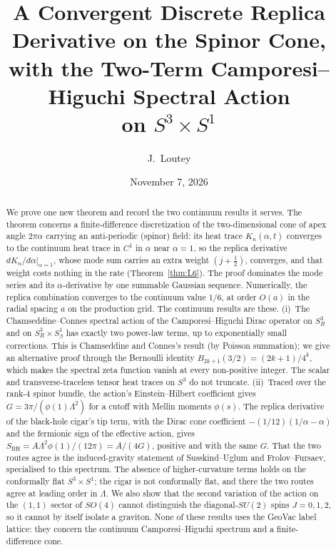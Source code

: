 \documentclass[11pt,a4paper]{article}
\title{A Convergent Discrete Replica Derivative on the Spinor Cone, \\
       with the Two-Term Camporesi--Higuchi Spectral Action \\
       on $S^3 \times S^1$}
\author{J.~Loutey}
\date{November 7, 2026}
\theoremstyle{plain}
\theoremstyle{definition}
\newcommand{\sthree}{S^{3}}
\newcommand{\BH}{\mathrm{BH}}
\renewcommand{\_}{\textunderscore\allowbreak}
\begin{document}
\maketitle

\begin{abstract}
We prove one new theorem and record the two continuum results it serves.
The theorem concerns a finite-difference discretization of the
two-dimensional cone of apex angle $2\pi\alpha$ carrying an
anti-periodic (spinor) field: its heat trace $K_n(\alpha, t)$ converges
to the continuum heat trace in $C^1$ in $\alpha$ near $\alpha = 1$, so the
replica derivative $dK_n/d\alpha|_{\alpha=1}$, whose mode sum carries an
extra weight $(j+\tfrac12)$, converges, and that weight costs nothing in
the rate (Theorem~\ref{thm:L6}). The proof dominates the mode series and
its $\alpha$-derivative by one summable Gaussian sequence. Numerically, the
replica combination converges to the continuum value $1/6$, at order
$O(a)$ in the radial spacing $a$ on the production grid. The continuum
results are these. (i)~The Chamseddine--Connes spectral action of the
Camporesi--Higuchi Dirac operator on $\sthree_R$ and on
$\sthree_R \times S^1_\beta$ has exactly two power-law terms, up to
exponentially small corrections. This is Chamseddine and Connes's result
(by Poisson summation); we give an alternative proof through the
Bernoulli identity $B_{2k+1}(3/2) = (2k{+}1)/4^k$, which makes the
spectral zeta function vanish at every non-positive integer. The scalar
and transverse-traceless tensor heat traces on $\sthree$ do not
truncate. (ii)~Traced over the rank-4 spinor bundle, the action's
Einstein--Hilbert coefficient gives $G = 3\pi/(\phi(1)\Lambda^2)$ for a
cutoff with Mellin moments $\phi(s)$. The replica derivative of the
black-hole cigar's tip term, with the Dirac cone coefficient
$-(1/12)(1/\alpha - \alpha)$ and the fermionic sign of the effective
action, gives $S_{\BH} = A\Lambda^2\phi(1)/(12\pi) = A/(4G)$, positive and
with the same $G$. That the two routes agree is the induced-gravity
statement of Susskind--Uglum and Frolov--Fursaev, specialised to this
spectrum. The absence of higher-curvature terms holds on the conformally
flat $\sthree \times S^1$; the cigar is not conformally flat, and there
the two routes agree at leading order in $\Lambda$. We also show that the
second variation of the action on the $(1,1)$ sector of $SO(4)$ cannot
distinguish the diagonal-$SU(2)$ spins $J = 0, 1, 2$, so it cannot by
itself isolate a graviton. None of these results uses the GeoVac label
lattice: they concern the continuum Camporesi--Higuchi spectrum and a
finite-difference cone.
\end{abstract}
\end{document}

